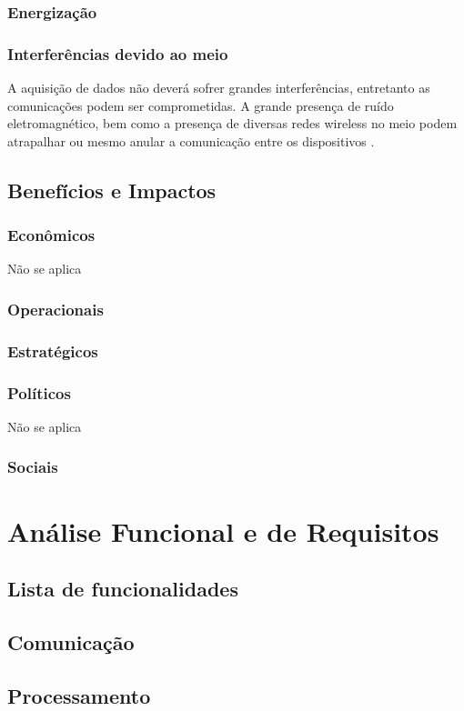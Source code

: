 \subsubsection{Energização}

\subsubsection{Interferências devido ao meio}
A aquisição de dados não deverá sofrer grandes interferências, entretanto as comunicações podem ser comprometidas. A grande presença de ruído eletromagnético, bem como a presença de diversas redes wireless no meio podem atrapalhar ou mesmo anular a comunicação entre os dispositivos .

\subsection{Benefícios e Impactos}
\subsubsection{Econômicos}
Não se aplica
\subsubsection{Operacionais}
\subsubsection{Estratégicos}
\subsubsection{Políticos}
Não se aplica
\subsubsection{Sociais}


\section{Análise Funcional e de Requisitos}
\subsection{Lista de funcionalidades}
\subsection{Comunicação}
\subsection{Processamento}
